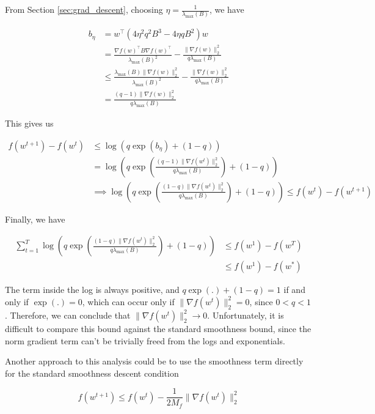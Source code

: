 \documentclass[11pt]{article}
\begin{document}
From Section \ref{sec:grad_descent}, choosing $\eta = \frac{1}{\lambda_{\max}(B)}$, we have

\begin{align*}
    b_\eta &= w^{\top} ( 4 \eta^2 q^2 B^3 - 4 \eta q B^2)w \\
    &= \frac{\nabla f(w)^{\top} B \nabla f(w)^{\top}}{\lambda_{\max}(B)^2} - \frac{\| \nabla f(w) \|_2^2}{q \lambda_{\max}(B)} \\
    &\leq \frac{ \lambda_{\max}(B) \| \nabla f(w) \|_2^2}{\lambda_{\max}(B)^2} - \frac{\| \nabla f(w) \|_2^2}{q \lambda_{\max}(B)}\\
    &= \frac{(q-1) \| \nabla f(w) \|_2^2}{q \lambda_{\max}(B)}
\end{align*}

This gives us

\begin{align*}
    f(w^{t+1}) - f(w^t) &\leq \log( q \exp(b_\eta ) + (1 - q)) \\
    &= \log \left( q \exp \left( \frac{(q-1) \| \nabla f(w^t) \|_2^2}{q \lambda_{\max}(B)} \right) + (1 - q) \right) \\
    &\implies \log \left( q \exp \left( \frac{(1-q) \| \nabla f(w^t) \|_2^2}{q \lambda_{\max}(B)} \right) + (1-q) \right) \leq f(w^t) - f(w^{t+1}) 
\end{align*}

Finally, we have

\begin{align*}
    \sum_{t=1}^{T} \log \left( q \exp \left( \frac{(1-q) \| \nabla f(w^t) \|_2^2}{q \lambda_{\max}(B)} \right) + (1-q) \right) &\leq f(w^1) - f(w^{T}) \\
    &\leq f(w^1) - f(w^{*})
\end{align*}

The term inside the log is always positive, and $q \exp(.) + (1-q) = 1$ if and only if $\exp(.) = 0$, which can occur only if $\| \nabla f(w^t) \|_2^2 = 0$, since $0 < q < 1$. Therefore, we can conclude that $\| \nabla f(w^t) \|_2^2 \rightarrow 0$. Unfortunately, it is difficult to compare this bound against the standard smoothness bound, since the norm gradient term can't be trivially freed from the logs and exponentials.

Another approach to this analysis could be to use the smoothness term directly for the standard smoothness descent condition

\begin{equation}
    f(w^{t+1}) \leq f(w^t) - \frac{1}{2M_f}\| \nabla f(w^t) \|_2^2
\end{equation}
\end{document}
